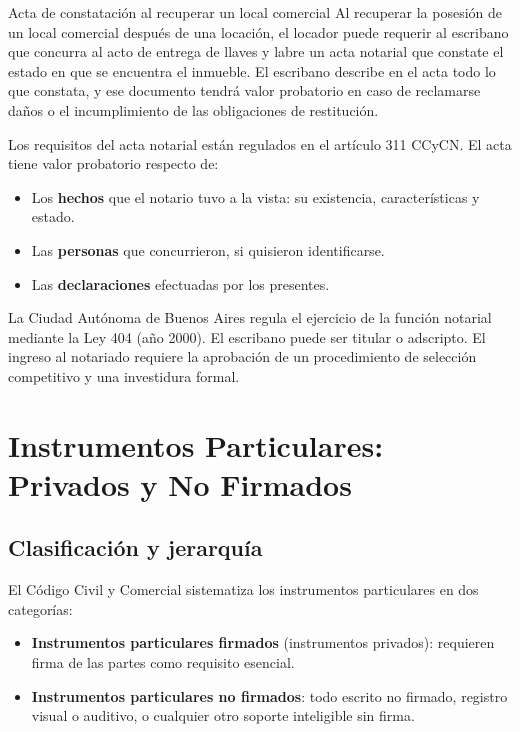 \documentclass[12pt,oneside]{book}
\begin{document}
\begin{example}{Acta de constatación al recuperar un local comercial}
Al recuperar la posesión de un local comercial después de una locación, el locador puede requerir al escribano que concurra al acto de entrega de llaves y labre un acta notarial que constate el estado en que se encuentra el inmueble. El escribano describe en el acta todo lo que constata, y ese documento tendrá valor probatorio en caso de reclamarse daños o el incumplimiento de las obligaciones de restitución.
\end{example}

Los requisitos del acta notarial están regulados en el artículo 311 CCyCN. El acta tiene valor probatorio respecto de:

\begin{itemize}
    \item Los \textbf{hechos} que el notario tuvo a la vista: su existencia, características y estado.
    \item Las \textbf{personas} que concurrieron, si quisieron identificarse.
    \item Las \textbf{declaraciones} efectuadas por los presentes.
\end{itemize}

\begin{note}
La Ciudad Autónoma de Buenos Aires regula el ejercicio de la función notarial mediante la Ley 404 (año 2000). El escribano puede ser titular o adscripto. El ingreso al notariado requiere la aprobación de un procedimiento de selección competitivo y una investidura formal.
\end{note}

\chapter{Instrumentos Particulares: Privados y No Firmados}

\section{Clasificación y jerarquía}

El Código Civil y Comercial sistematiza los instrumentos particulares en dos categorías:

\begin{itemize}
    \item \textbf{Instrumentos particulares firmados} (instrumentos privados): requieren firma de las partes como requisito esencial.
    \item \textbf{Instrumentos particulares no firmados}: todo escrito no firmado, registro visual o auditivo, o cualquier otro soporte inteligible sin firma.
\end{itemize}
\end{document}
